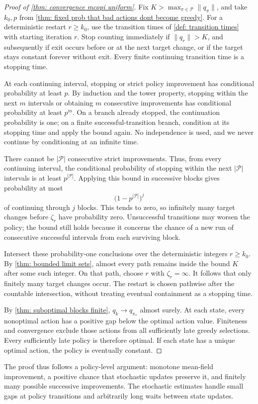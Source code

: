\begin{proof}[Proof of \autoref{thm: convergence mcopi uniform}]
Fix $K>\max_{\pi\in\mathcal P}\|q_\pi\|$, and take $k_0,p$ from \autoref{thm: fixed prob that bad actions dont become greedy}. For a deterministic restart $r\ge k_0$, use the transition times of \autoref{def: transition times} with starting iteration $r$. Stop counting immediately if $\|q_r\|>K$, and subsequently if exit occurs before or at the next target change, or if the target stays constant forever without exit. Every finite continuing transition time is a stopping time.

At each continuing interval, stopping or strict policy improvement has conditional probability at least $p$. By induction and the tower property, stopping within the next $m$ intervals or obtaining $m$ consecutive improvements has conditional probability at least $p^m$. On a branch already stopped, the continuation probability is one; on a finite successful-transition branch, condition at its stopping time and apply the bound again. No independence is used, and we never continue by conditioning at an infinite time.

There cannot be $|\mathcal P|$ consecutive strict improvements. Thus, from every continuing interval, the conditional probability of stopping within the next $|\mathcal P|$ intervals is at least $p^{|\mathcal P|}$. Applying this bound in successive blocks gives probability at most
\[
\big(1-p^{|\mathcal P|}\big)^j
\]
of continuing through $j$ blocks. This tends to zero, so infinitely many target changes before $\zeta_r$ have probability zero. Unsuccessful transitions may worsen the policy; the bound still holds because it concerns the chance of a new run of consecutive successful intervals from each surviving block.

Intersect these probability-one conclusions over the deterministic integers $r\ge k_0$. By \autoref{thm: bounded limit sets}, almost every path remains inside the bound $K$ after some such integer. On that path, choose $r$ with $\zeta_r=\infty$. It follows that only finitely many target changes occur. The restart is chosen pathwise after the countable intersection, without treating eventual containment as a stopping time.

By \autoref{thm: suboptimal blocks finite}, $q_k\to q_{\pi_*}$ almost surely. At each state, every nonoptimal action has a positive gap below the optimal action value. Finiteness and convergence exclude those actions from all sufficiently late greedy selections. Every sufficiently late policy is therefore optimal. If each state has a unique optimal action, the policy is eventually constant.
\end{proof}

The proof thus follows a policy-level argument: monotone mean-field improvement, a positive chance that stochastic updates preserve it, and finitely many possible successive improvements. The stochastic estimates handle small gaps at policy transitions and arbitrarily long waits between state updates.

